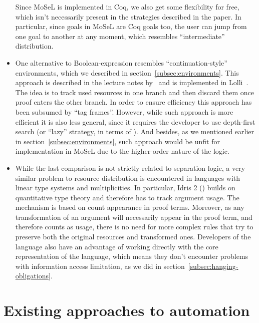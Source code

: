 \begin{itemize}
  Since MoSeL is implemented in Coq, we also get some flexibility for free, which isn't necessarily present in the strategies described in the paper.
  In particular, since goals in MoSeL are Coq goals too, the user can jump from one goal to another at any moment, which resembles ``intermediate'' distribution.
\item One alternative to Boolean-expression resembles ``continuation-style'' environments, which we described in section~\ref{subsec:environments}.
  This approach is described in the lecture notes by~\citet{pfenningLogicProgrammingLecture2007} and is implemented in Lolli~\cite{LolliLinearLogic}.
  The idea is to track used resources in one branch and then discard them once proof enters the other branch.
  In order to ensure efficiency this approach has been subsumed by ``tag frames''\cite{hodasTagFrameSystemResource2002, lopezImplementingEfficientResource2004}.
  However, while such approach is more efficient it is also less general, since it requires the developer to use depth-first search (or ``lazy'' strategy, in terms of \citet{harlandResourceDistributionBooleanConstraints2003}).
  And besides, as we mentioned earlier in section~\ref{subsec:environments}, such approach would be unfit for implementation in MoSeL due to the higher-order nature of the logic.
\item While the last comparison is not strictly related to separation logic, a very similar problem to resource distribution is encountered in languages with linear type systems and multiplicities.
  In particular, Idris 2 (\cite{MultiplicitiesIdris2Documentation}) builds on quantitative type theory and therefore has to track argument usage.
  The mechanism is based on count appearance in proof terms.
  Moreover, as any transformation of an argument will necessarily appear in the proof term, and therefore counts as usage, there is no need for more complex rules that try to preserve both the original resources and transformed ones.
  Developers of the language also have an advantage of working directly with the core representation of the language, which means they don't encounter problems with information access limitation, as we did in section~\ref{subsec:hanging-obligations}.
\end{itemize}

\section{Existing approaches to automation}
\label{sec:exist-appr-autom}


